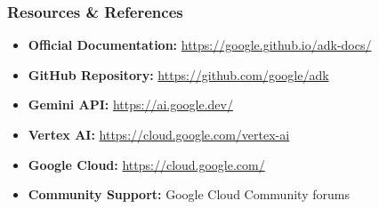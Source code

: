 \begin{frame}[fragile]\frametitle{Resources \& References}
      \begin{itemize}
	\item \textbf{Official Documentation:} \url{https://google.github.io/adk-docs/}
	\item \textbf{GitHub Repository:} \url{https://github.com/google/adk}
	\item \textbf{Gemini API:} \url{https://ai.google.dev/}
	\item \textbf{Vertex AI:} \url{https://cloud.google.com/vertex-ai}
	\item \textbf{Google Cloud:} \url{https://cloud.google.com/}
	\item \textbf{Community Support:} Google Cloud Community forums
	  \end{itemize}
\end{frame}


